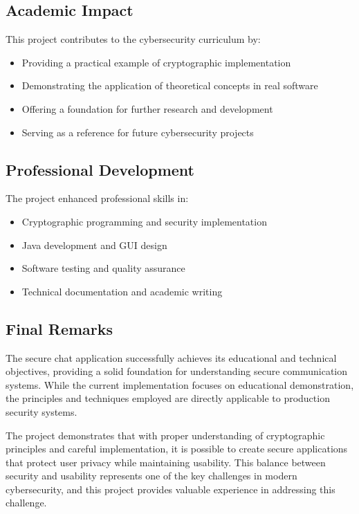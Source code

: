 \documentclass[12pt,a4paper]{article}
\begin{document}
\subsection{Academic Impact}

This project contributes to the cybersecurity curriculum by:

\begin{itemize}
    \item Providing a practical example of cryptographic implementation
    \item Demonstrating the application of theoretical concepts in real software
    \item Offering a foundation for further research and development
    \item Serving as a reference for future cybersecurity projects
\end{itemize}

\subsection{Professional Development}

The project enhanced professional skills in:

\begin{itemize}
    \item Cryptographic programming and security implementation
    \item Java development and GUI design
    \item Software testing and quality assurance
    \item Technical documentation and academic writing
\end{itemize}

\subsection{Final Remarks}

The secure chat application successfully achieves its educational and technical objectives, providing a solid foundation for understanding secure communication systems. While the current implementation focuses on educational demonstration, the principles and techniques employed are directly applicable to production security systems.

The project demonstrates that with proper understanding of cryptographic principles and careful implementation, it is possible to create secure applications that protect user privacy while maintaining usability. This balance between security and usability represents one of the key challenges in modern cybersecurity, and this project provides valuable experience in addressing this challenge.
\end{document}
